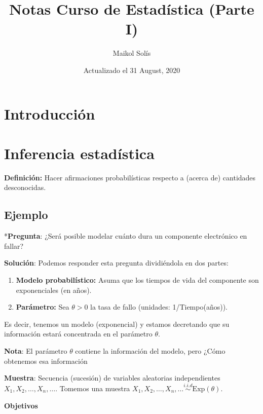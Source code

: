 \documentclass[
  12pt,
]{book}
\title{Notas Curso de Estadística (Parte I)}
\author{Maikol Solís}
\date{Actualizado el 31 August, 2020}
\providecommand{\tightlist}{%
  \setlength{\itemsep}{0pt}\setlength{\parskip}{0pt}}
\begin{document}
\maketitle

{
\hypersetup{linkcolor=}
\setcounter{tocdepth}{4}
\tableofcontents
}
\hypertarget{introducciuxf3n}{%
\chapter{Introducción}\label{introducciuxf3n}}

\hypertarget{inferencia-estaduxedstica}{%
\chapter{Inferencia estadística}\label{inferencia-estaduxedstica}}

\textbf{Definición:} Hacer afirmaciones probabilísticas respecto a (acerca de)
cantidades desconocidas.

\hypertarget{ejemplo}{%
\section{Ejemplo}\label{ejemplo}}

*\textbf{Pregunta}: ¿Será posible modelar cuánto dura un componente electrónico en
fallar?

\textbf{Solución}: Podemos responder esta pregunta dividiéndola en dos partes:

\begin{enumerate}
\def\labelenumi{\arabic{enumi}.}
\tightlist
\item
  \textbf{Modelo probabilístico:} Asuma que los tiempos de vida del componente son
  exponenciales (en años).
\item
  \textbf{Parámetro:} Sea \(\theta > 0\) la tasa de fallo (unidades: 1/Tiempo(años)).
\end{enumerate}

Es decir, tenemos un modelo (exponencial) y estamos decretando que su información estará concentrada en el parámetro \(\theta\).

\textbf{Nota}: El parámetro \(\theta\) contiene la información del modelo,
pero ¿Cómo obtenemos esa información

\textbf{Muestra}: Secuencia (sucesión) de variables aleatorias independientes \(X_1,X_2,\dots, X_n,\dots\). Tomemos una muestra \(X_1,X_2,\dots, X_n,\dots \stackrel{i.i.d}{\sim} \text{Exp}(\theta)\).

\textbf{Objetivos}
\end{document}
